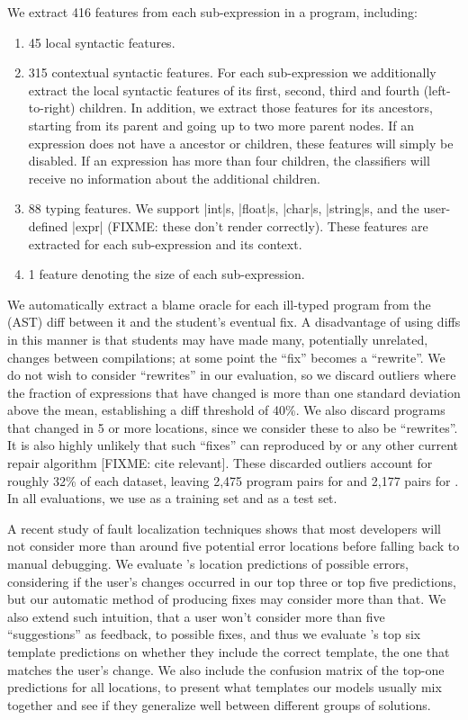 We extract 416 features from each sub-expression in a
program, including:
%
\begin{enumerate}
  \item 45 local syntactic features.
  \item 315 contextual syntactic features. For each sub-expression we
    additionally extract the local syntactic features of its first, second,
    third and fourth (left-to-right) children. In addition, we extract those
    features for its ancestors, starting from its parent and going up to two
    more parent nodes. If an expression does not have a ancestor or children,
    these features will simply be disabled. If an expression has more than four
    children, the classifiers will receive no information about the additional
    children.
  \item 88 typing features. We support |int|s, |float|s, |char|s, |string|s, and
    the user-defined |expr| (FIXME: these don't render correctly). These
    features are extracted for each
    sub-expression and its context.
  \item 1 feature denoting the size of each sub-expression.
\end{enumerate}

We automatically extract a blame oracle for each ill-typed program from the
(AST) diff between it and the student's eventual fix. A disadvantage of using
diffs in this manner is that students may have made many, potentially unrelated,
changes between compilations; at some point the ``fix'' becomes a ``rewrite''.
We do not wish to consider ``rewrites'' in our evaluation, so we discard
outliers where the fraction of expressions that have changed is more than one
standard deviation above the mean, establishing a diff threshold of 40\%. We
also discard programs that changed in 5 or more locations, since we consider
these to also be ``rewrites''. It
is also highly unlikely that such ``fixes'' can reproduced by \toolname or any
other current repair algorithm [FIXME: cite relevant]. 
These discarded outliers account for
roughly 32\% of each dataset, leaving 2,475 program pairs for \SPRING
and 2,177 pairs for \FALL. In all evaluations, we use \SPRING as a training
set and \FALL as a test set.

A recent study of fault localization techniques \citep[][]{Kochhar2016-oc} shows
that most developers will not consider more than around five potential error
locations before falling back to manual debugging. We evaluate \toolname's
location predictions of possible errors, considering if the user's changes
occurred in our top three or top five predictions, but our automatic method of
producing fixes may consider more than that. We also extend such intuition, that
a user won't consider more than five ``suggestions'' as feedback, to possible
fixes, and thus we evaluate \toolname's top six template predictions on whether
they include the correct template, \ie the one that matches the user's change. We also
include the confusion matrix of the top-one predictions for all locations, 
to present what templates our models usually mix together and see if they
generalize well between different groups of solutions.

